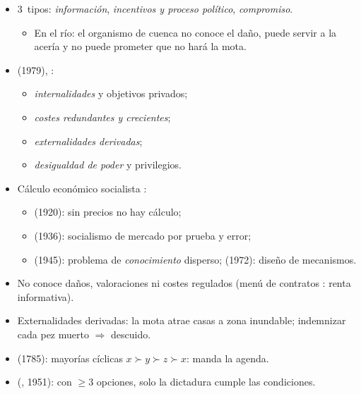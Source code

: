 \documentclass{article}
\begin{document}
\begin{columnas}
\begin{itemize}
\item 3~tipos: \emph{información}, \emph{incentivos y proceso político}, \emph{compromiso}.
  \begin{itemize}
  \item En el río: el organismo de cuenca no conoce el daño, puede servir a la acería y no puede prometer que no hará la mota.
  \end{itemize}
\item {} (1979), :
  \begin{itemize}
  \item \emph{internalidades} y objetivos privados;
  \item \emph{costes redundantes y crecientes};
  \item \emph{externalidades derivadas};
  \item \emph{desigualdad de poder} y privilegios.
  \end{itemize}
\end{itemize}
\begin{itemize}
\item Cálculo económico socialista :
  \begin{itemize}
  \item {} (1920): sin precios no hay cálculo;
  \item {} (1936): socialismo de mercado por prueba y error;
  \item {} (1945): problema de \emph{conocimiento} disperso;  (1972): diseño de mecanismos.
  \end{itemize}
\item No conoce daños, valoraciones ni costes regulados (menú de contratos : renta informativa).
\item Externalidades derivadas: la mota atrae casas a zona inundable; indemnizar cada pez muerto $\Rightarrow$ descuido.
\end{itemize}
\begin{itemize}
\item {} (1785): mayorías cíclicas $x\succ y\succ z\succ x$: manda la agenda.
\item {} (, 1951): con $\geq3$ opciones, solo la dictadura cumple las condiciones.

\end{itemize}
\end{columnas}
\end{document}
